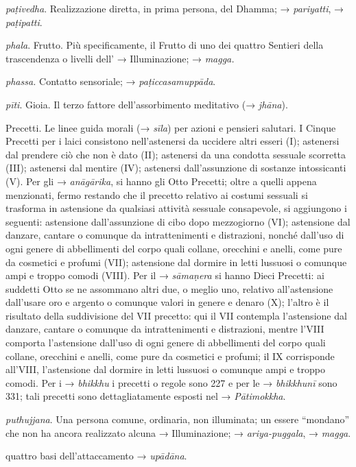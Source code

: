 \emph{paṭivedha}. Realizzazione diretta, in prima persona, del Dhamma; →
\emph{pariyatti}, → \emph{paṭipatti}.

\emph{phala}. Frutto. Più specificamente, il Frutto di uno dei quattro
Sentieri della trascendenza o livelli dell' → Illuminazione; →
\emph{magga.}

\emph{phassa.} Contatto sensoriale; → \emph{paṭiccasamuppāda}.

\emph{pīti}. Gioia. Il terzo fattore dell'assorbimento meditativo (→
\emph{jhāna}).

Precetti. Le linee guida morali (→ \emph{sīla}) per azioni e pensieri
salutari. I Cinque Precetti per i laici consistono nell'astenersi da
uccidere altri esseri (I); astenersi dal prendere ciò che non è dato
(II); astenersi da una condotta sessuale scorretta (III); astenersi dal
mentire (IV); astenersi dall'assunzione di sostanze intossicanti (V).
Per gli → \emph{anāgārika}, si hanno gli Otto Precetti; oltre a quelli
appena menzionati, fermo restando che il precetto relativo ai costumi
sessuali si trasforma in astensione da qualsiasi attività sessuale
consapevole, si aggiungono i seguenti: astensione dall'assunzione di
cibo dopo mezzogiorno (VI); astensione dal danzare, cantare o comunque
da intrattenimenti e distrazioni, nonché dall'uso di ogni genere di
abbellimenti del corpo quali collane, orecchini e anelli, come pure da
cosmetici e profumi (VII); astensione dal dormire in letti lussuosi o
comunque ampi e troppo comodi (VIII). Per il → \emph{sāmaṇera} si hanno
Dieci Precetti: ai suddetti Otto se ne assommano altri due, o meglio
uno, relativo all'astensione dall'usare oro e argento o comunque valori
in genere e denaro (X); l'altro è il risultato della suddivisione del
VII precetto: qui il VII contempla l'astensione dal danzare, cantare o
comunque da intrattenimenti e distrazioni, mentre l'VIII comporta
l'astensione dall'uso di ogni genere di abbellimenti del corpo quali
collane, orecchini e anelli, come pure da cosmetici e profumi; il IX
corrisponde all'VIII, l'astensione dal dormire in letti lussuosi o
comunque ampi e troppo comodi. Per i → \emph{bhikkhu} i precetti o
regole sono 227 e per le → \emph{bhikkhunī} sono 331; tali precetti sono
dettagliatamente esposti nel → \emph{Pātimokkha}.

\emph{puthujjana}. Una persona comune, ordinaria, non illuminata; un
essere ``mondano'' che non ha ancora realizzato alcuna → Illuminazione;
→ \emph{ariya-puggala}, → \emph{magga}.

quattro basi dell'attaccamento → \emph{upādāna}.

